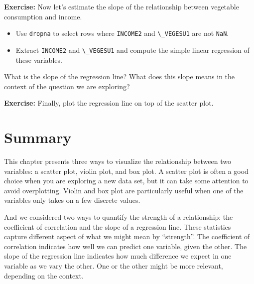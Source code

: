 \textbf{Exercise:} Now let's estimate the slope of the relationship
between vegetable consumption and income.

\begin{itemize}
\item
  Use \passthrough{\lstinline!dropna!} to select rows where
  \passthrough{\lstinline!INCOME2!} and
  \passthrough{\lstinline!\_VEGESU1!} are not
  \passthrough{\lstinline!NaN!}.
\item
  Extract \passthrough{\lstinline!INCOME2!} and
  \passthrough{\lstinline!\_VEGESU1!} and compute the simple linear
  regression of these variables.
\end{itemize}

What is the slope of the regression line? What does this slope means in
the context of the question we are exploring?

\textbf{Exercise:} Finally, plot the regression line on top of the
scatter plot.

\hypertarget{summary}{%
\section{Summary}\label{summary}}

This chapter presents three ways to visualize the relationship between
two variables: a scatter plot, violin plot, and box plot. A scatter plot
is often a good choice when you are exploring a new data set, but it can
take some attention to avoid overplotting. Violin and box plot are
particularly useful when one of the variables only takes on a few
discrete values.

And we considered two ways to quantify the strength of a relationship:
the coefficient of correlation and the slope of a regression line. These
statistics capture different aspect of what we might mean by
``strength''. The coefficient of correlation indicates how well we can
predict one variable, given the other. The slope of the regression line
indicates how much difference we expect in one variable as we vary the
other. One or the other might be more relevant, depending on the
context.

